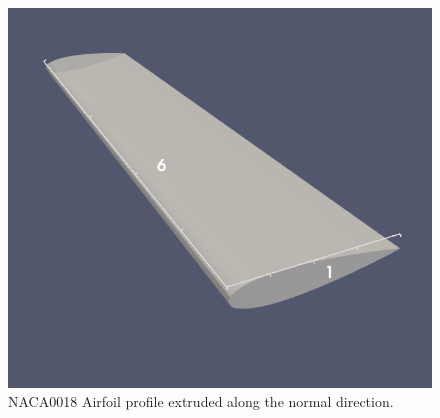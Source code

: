 \begin{figure}
	\centering
	\includegraphics[width=0.6\linewidth]{img/r/naca0018.png}
	\caption{NACA0018 Airfoil profile extruded along the normal direction.}
	\label{fig-naca0018}
\end{figure}

